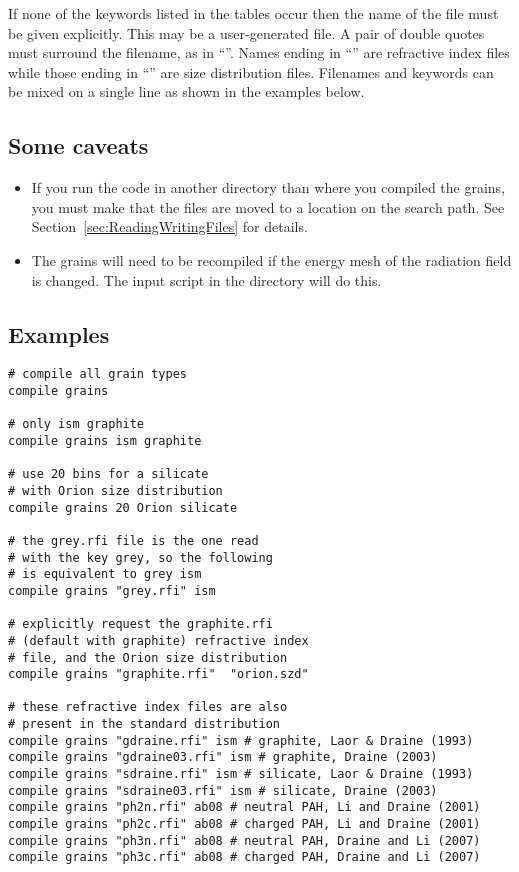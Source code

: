   If none of the keywords
listed in the tables
occur then the name of the file must be given explicitly.
This may be a user-generated file.
A pair of double quotes must
surround the filename, as in ``''.
Names ending in
``'' are
refractive index files while those ending in ``''
are size distribution files.
Filenames and keywords can be mixed on a single line as shown in
the examples below.

\subsection{Some caveats}

\begin{itemize}

\item
  If you run the code in another directory than where you compiled the grains,
  you must make that the files are moved to a location on the search path.
  See Section~\ref{sec:ReadingWritingFiles} for details.

\item
The grains will need to be recompiled if the energy mesh of the radiation
field is changed. 
The input script  in the   
directory will do this.

\end{itemize}

\subsection{Examples}
\begin{verbatim}
# compile all grain types
compile grains

# only ism graphite
compile grains ism graphite

# use 20 bins for a silicate
# with Orion size distribution
compile grains 20 Orion silicate

# the grey.rfi file is the one read
# with the key grey, so the following
# is equivalent to grey ism
compile grains "grey.rfi" ism

# explicitly request the graphite.rfi
# (default with graphite) refractive index
# file, and the Orion size distribution
compile grains "graphite.rfi"  "orion.szd"

# these refractive index files are also
# present in the standard distribution
compile grains "gdraine.rfi" ism # graphite, Laor & Draine (1993)
compile grains "gdraine03.rfi" ism # graphite, Draine (2003)
compile grains "sdraine.rfi" ism # silicate, Laor & Draine (1993)
compile grains "sdraine03.rfi" ism # silicate, Draine (2003)
compile grains "ph2n.rfi" ab08 # neutral PAH, Li and Draine (2001)
compile grains "ph2c.rfi" ab08 # charged PAH, Li and Draine (2001)
compile grains "ph3n.rfi" ab08 # neutral PAH, Draine and Li (2007)
compile grains "ph3c.rfi" ab08 # charged PAH, Draine and Li (2007)
\end{verbatim}

